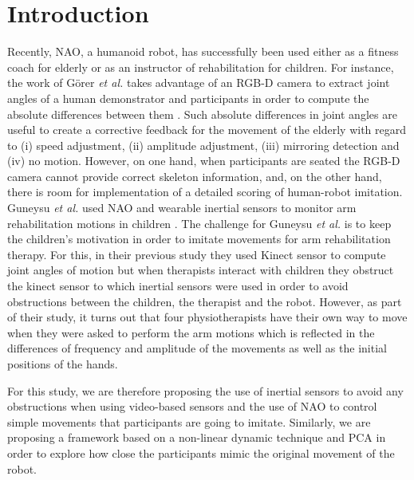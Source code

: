 \documentclass{sig-alternate-05-2015}
\begin{document}


\section{Introduction}
Recently, NAO, a humanoid robot, has successfully been used either as a fitness coach for elderly 
or as an instructor of rehabilitation for children.
For instance, the work of G{\"{o}}rer \textit{et al.} takes advantage of an RGB-D camera to 
extract joint angles of a human demonstrator and participants in order to
compute the absolute differences between them \cite{Gorer2016}. Such absolute differences
in joint angles are useful to create a corrective feedback for the movement of the elderly 
with regard to (i) speed adjustment, (ii) amplitude adjustment, (iii) mirroring detection
and (iv) no motion.
However, on one hand, when participants are seated the RGB-D camera cannot provide correct skeleton information,
and, on the other hand, there is room for implementation of a detailed scoring of human-robot imitation.
Guneysu \textit{et al.} used NAO and wearable inertial sensors
to monitor arm rehabilitation motions in children \cite{Guneysu2015}.
The challenge for Guneysu \textit{et al.} is to keep the children's motivation in order to imitate 
movements for arm rehabilitation therapy. For this, in their previous study they used Kinect sensor
to compute joint angles of motion but when therapists interact with children they obstruct 
the kinect sensor to which inertial sensors were used in order 
to avoid obstructions between the children, the therapist and  the robot.
However, as part of their study, it turns out that four physiotherapists have their own way to move
when they were asked to perform the arm motions
which is reflected in the differences of frequency and amplitude of the movements
as well as the initial positions of the hands.

For this study, we are therefore proposing 
the use of inertial sensors to avoid any obstructions when using video-based sensors
and the use of NAO to control simple movements that participants are going to imitate.
Similarly, we are proposing a framework based on a non-linear dynamic technique and PCA
in order to explore 
how close the participants mimic the original movement of the robot.
\end{document}
